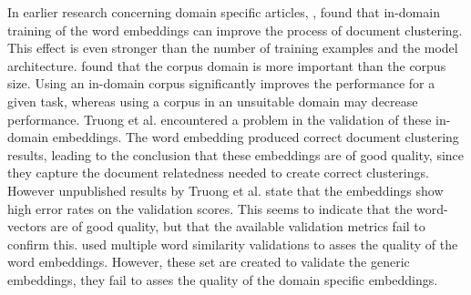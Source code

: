 \documentclass[../../Thesis.tex]{subfiles}
\begin{document}
In earlier research concerning domain specific articles,  \citet{Truong2017Thesis}, found that in-domain training of the word embeddings can  improve the process of document clustering. This effect is even stronger than the number of training examples and the model architecture. \citet{lai2016generate} found that the corpus domain is more important than the corpus size. Using an in-domain corpus significantly improves the performance for a given task, whereas using a corpus in an unsuitable domain may decrease performance.
Truong et al. encountered a problem in the validation of these in-domain embeddings. The word embedding produced correct document clustering results, leading to the conclusion that these embeddings are of good quality, since they capture the document relatedness needed to create correct clusterings. However unpublished results by Truong et al. state that the embeddings show high error rates on the validation scores. This seems to indicate that the word-vectors are of good quality, but that the available validation metrics fail to confirm this. \citet{Truong2017Thesis} used multiple word similarity validations to asses the quality of the word embeddings. However, these set are created to validate the generic embeddings, they fail to asses the quality of the domain specific embeddings.
\end{document}
